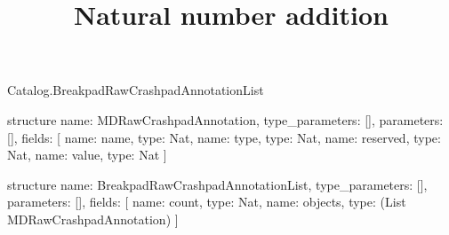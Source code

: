 \begin{lexlean}{Catalog.BreakpadRawCrashpadAnnotationList}
\title{Natural number addition}
\begin{semanticmodule}
structure{
  name: MDRawCrashpadAnnotation,
  type_parameters: [],
  parameters: [],
  fields: [
    {name: name, type: Nat},
    {name: type, type: Nat},
    {name: reserved, type: Nat},
    {name: value, type: Nat}
  ]
}

structure{
  name: BreakpadRawCrashpadAnnotationList,
  type_parameters: [],
  parameters: [],
  fields: [
    {name: count, type: Nat},
    {name: objects, type: (List MDRawCrashpadAnnotation)}
  ]
}
\end{semanticmodule}
\end{lexlean}
